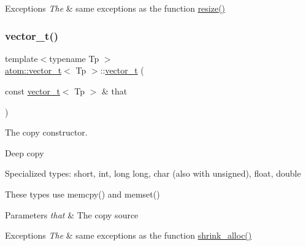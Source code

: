 \begin{DoxyExceptions}{Exceptions}
{\em The} & same exceptions as the function \hyperlink{classatom_1_1vector__t_a5720e4e26657a55697d4335663cb6f10}{resize()} \\
\hline
\end{DoxyExceptions}
\mbox{\label{classatom_1_1vector__t_a2c546a0310265fa1eabcc21ac4349d33}} 
\subsubsection{\texorpdfstring{vector\+\_\+t()}{vector\_t()}\hspace{0.1cm}{\footnotesize\ttfamily [2/3]}}
{\footnotesize\ttfamily template$<$typename Tp $>$ \\
\hyperlink{classatom_1_1vector__t}{atom\+::vector\+\_\+t}$<$ Tp $>$\+::\hyperlink{classatom_1_1vector__t}{vector\+\_\+t} (\begin{DoxyParamCaption}\item[{const \hyperlink{classatom_1_1vector__t}{vector\+\_\+t}$<$ Tp $>$ \&}]{that }\end{DoxyParamCaption})}



The copy constructor. 

Deep copy

Specialized types\+: short, int, long long, char (also with unsigned), float, double

These types use memcpy() and memset() 
\begin{DoxyParams}{Parameters}
{\em that} & The copy source \\
\hline
\end{DoxyParams}

\begin{DoxyExceptions}{Exceptions}
{\em The} & same exceptions as the function \hyperlink{classatom_1_1vector__t_afdf1ffed030302fa380605478984b854}{shrink\+\_\+alloc()} \\
\hline
\end{DoxyExceptions}
\mbox{\label{classatom_1_1vector__t_a7fb03f8164c86f7e9df312fe4da33fd0}} 
